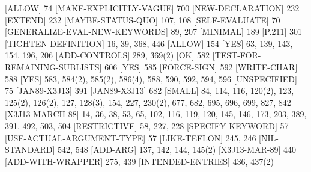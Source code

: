[ALLOW] {\footnotesize 74}
[MAKE-EXPLICITLY-VAGUE] {\footnotesize 700}
[NEW-DECLARATION] {\footnotesize 232}
[EXTEND] {\footnotesize 232}
[MAYBE-STATUS-QUO] {\footnotesize 107, 108}
[SELF-EVALUATE] {\footnotesize 70}
[GENERALIZE-EVAL-NEW-KEYWORDS] {\footnotesize 89, 207}
[MINIMAL] {\footnotesize 189}
[P.211] {\footnotesize 301}
[TIGHTEN-DEFINITION] {\footnotesize 16, 39, 368, 446}
[ALLOW] {\footnotesize 154}
[YES] {\footnotesize 63, 139, 143, 154, 196, 206}
[ADD-CONTROLS] {\footnotesize 289, 369(2)}
[OK] {\footnotesize 582}
[TEST-FOR-REMAINING-SUBLISTS] {\footnotesize 606}
[YES] {\footnotesize 585}
[FORCE-SIGN] {\footnotesize 592}
[WRITE-CHAR] {\footnotesize 588}
[YES] {\footnotesize 583, 584(2), 585(2), 586(4), 588, 590, 592, 594, 596}
[UNSPECIFIED] {\footnotesize 75}
[JAN89-X3J13] {\footnotesize 391}
[JAN89-X3J13] {\footnotesize 682}
[SMALL] {\footnotesize 84, 114, 116, 120(2), 123, 125(2), 126(2), 127, 128(3), 154, 
                                 227, 230(2), 677, 682, 695, 696, 699, 827, 842}
[X3J13-MARCH-88] {\footnotesize 14, 36, 38, 53, 65, 102, 116, 119, 120, 145, 146, 
                                           173, 203, 389, 391, 492, 503, 504}
[RESTRICTIVE] {\footnotesize 58, 227, 228}
[SPECIFY-KEYWORD] {\footnotesize 57}
[USE-ACTUAL-ARGUMENT-TYPE] {\footnotesize 57}
[LIKE-TEFLON] {\footnotesize 245, 246}
[NIL-STANDARD] {\footnotesize 542, 548}
[ADD-ARG] {\footnotesize 137, 142, 144, 145(2)}
[X3J13-MAR-89] {\footnotesize 440}
[ADD-WITH-WRAPPER] {\footnotesize 275, 439}
[INTENDED-ENTRIES] {\footnotesize 436, 437(2)}
